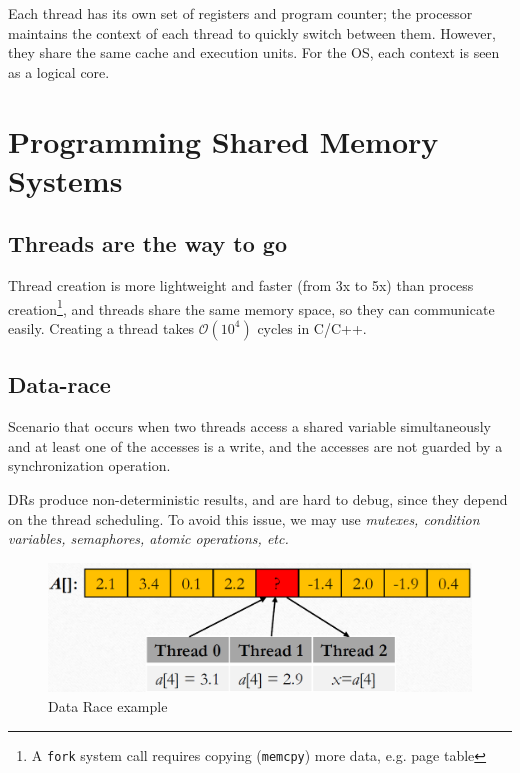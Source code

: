Each thread has its own set of registers and program counter; the processor maintains the context of each thread to quickly switch between them.
However, they share the same cache and execution units.
For the OS, each context is seen as a logical core.

\section{Programming Shared Memory Systems}
\subsection{Threads are the way to go}

Thread creation is more lightweight and faster (from 3x to 5x) than process creation\footnote{A \texttt{fork} system call requires copying (\texttt{memcpy}) more data, e.g. page table}, and threads share the same memory space, so they can communicate easily.
Creating a thread takes $\mathcal{O}(10^4)$ cycles in C/C++.

\subsection{Data-race}
\begin{definition}
    Scenario that occurs when two threads access a shared variable simultaneously and at least one of the accesses is a write, and the accesses are not guarded by a synchronization operation.   
\end{definition}
\begin{paracol}{2}
   DRs produce non-deterministic results, and are hard to debug, since they depend on the thread scheduling. To avoid this issue, we may use \textit{mutexes, condition variables, semaphores, atomic operations, etc.}
   
   
   \switchcolumn

   \begin{figure}[htbp]
      \centering
      \includegraphics{images/04/data_race.png}
      \caption{Data Race example}
      \label{fig:04/data_race}
   \end{figure}

\end{paracol}